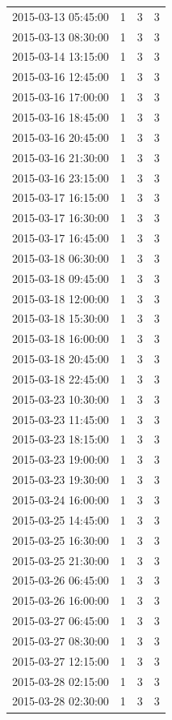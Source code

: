 \begin{tabular}{lrrr}
2015-03-13 05:45:00 & 1 & 3 & 3 \\
2015-03-13 08:30:00 & 1 & 3 & 3 \\
2015-03-14 13:15:00 & 1 & 3 & 3 \\
2015-03-16 12:45:00 & 1 & 3 & 3 \\
2015-03-16 17:00:00 & 1 & 3 & 3 \\
2015-03-16 18:45:00 & 1 & 3 & 3 \\
2015-03-16 20:45:00 & 1 & 3 & 3 \\
2015-03-16 21:30:00 & 1 & 3 & 3 \\
2015-03-16 23:15:00 & 1 & 3 & 3 \\
2015-03-17 16:15:00 & 1 & 3 & 3 \\
2015-03-17 16:30:00 & 1 & 3 & 3 \\
2015-03-17 16:45:00 & 1 & 3 & 3 \\
2015-03-18 06:30:00 & 1 & 3 & 3 \\
2015-03-18 09:45:00 & 1 & 3 & 3 \\
2015-03-18 12:00:00 & 1 & 3 & 3 \\
2015-03-18 15:30:00 & 1 & 3 & 3 \\
2015-03-18 16:00:00 & 1 & 3 & 3 \\
2015-03-18 20:45:00 & 1 & 3 & 3 \\
2015-03-18 22:45:00 & 1 & 3 & 3 \\
2015-03-23 10:30:00 & 1 & 3 & 3 \\
2015-03-23 11:45:00 & 1 & 3 & 3 \\
2015-03-23 18:15:00 & 1 & 3 & 3 \\
2015-03-23 19:00:00 & 1 & 3 & 3 \\
2015-03-23 19:30:00 & 1 & 3 & 3 \\
2015-03-24 16:00:00 & 1 & 3 & 3 \\
2015-03-25 14:45:00 & 1 & 3 & 3 \\
2015-03-25 16:30:00 & 1 & 3 & 3 \\
2015-03-25 21:30:00 & 1 & 3 & 3 \\
2015-03-26 06:45:00 & 1 & 3 & 3 \\
2015-03-26 16:00:00 & 1 & 3 & 3 \\
2015-03-27 06:45:00 & 1 & 3 & 3 \\
2015-03-27 08:30:00 & 1 & 3 & 3 \\
2015-03-27 12:15:00 & 1 & 3 & 3 \\
2015-03-28 02:15:00 & 1 & 3 & 3 \\
2015-03-28 02:30:00 & 1 & 3 & 3 \\

\end{tabular}
